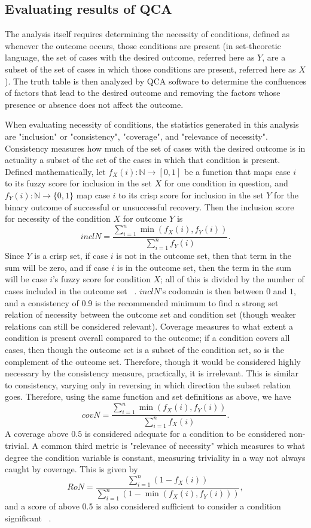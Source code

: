 \documentclass{article}
\begin{document}
\subsection{Evaluating results of QCA}
The analysis itself requires determining the necessity of conditions, defined as whenever the outcome occurs, those conditions are present (in set-theoretic language, the set of cases with the desired outcome, referred here as $Y$, are a subset of the set of cases in which those conditions are present, referred here as $X$). The truth table is then analyzed by QCA software to determine the confluences of factors that lead to the desired outcome and removing the factors whose presence or absence does not affect the outcome. 

When evaluating necessity of conditions, the statistics generated in this analysis are "inclusion" or "consistency", "coverage", and "relevance of necessity". Consistency measures how much of the set of cases with the desired outcome is in actuality a subset of the set of the cases in which that condition is present. Defined mathematically, let $f_X(i):\mathbb{N}\to[0,1]$ be a function that maps case $i$ to its fuzzy score for inclusion in the set $X$ for one condition in question, and $f_Y(i):\mathbb{N}\to\{0,1\}$ map case $i$ to its crisp score for inclusion in the set $Y$ for the binary outcome of successful or unsuccessful recovery. Then the inclusion score for necessity of the condition $X$ for outcome $Y$ is
$$inclN=\frac{\sum_{i=1}^n\min(f_X(i),f_Y(i))}{\sum_{i=1}^n f_Y(i)}.$$
Since $Y$ is a crisp set, if case $i$ is not in the outcome set, then that term in the sum will be zero, and if case $i$ is in the outcome set, then the term in the sum will be case $i$'s fuzzy score for condition $X$; all of this is divided by the number of cases included in the outcome set ~\cite{dusa-book}. $inclN$'s codomain is then between $0$ and $1$, and a consistency of 0.9 is the recommended minimum to find a strong set relation of necessity between the outcome set and condition set (though weaker relations can still be considered relevant). Coverage measures to what extent a condition is present overall compared to the outcome; if a condition covers all cases, then though the outcome set is a subset of the condition set, so is the complement of the outcome set. Therefore, though it would be considered highly necessary by the consistency measure, practically, it is irrelevant. This is similar to consistency, varying only in reversing in which direction the subset relation goes. Therefore, using the same function and set definitions as above, we have
$$covN=\frac{\sum_{i=1}^n\min(f_X(i),f_Y(i))}{\sum_{i=1}^n f_X(i)}.$$ 
A coverage above $0.5$ is considered adequate for a condition to be considered non-trivial. A common third metric is "relevance of necessity" which measures to what degree the condition variable is constant, measuring triviality in a way not always caught by coverage. This is given by
$$RoN=\frac{\sum_{i=1}^n(1-f_X(i))}{\sum_{i=1}^n(1-\min(f_X(i),f_Y(i)))},$$
and a score of above 0.5 is also considered sufficient to consider a condition significant ~\cite{mello}.
\end{document}

